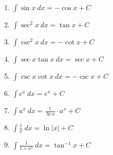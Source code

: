 {\begin{minipage}[t]{.55\specialboxlength}
\begin{enumerate}
\item $\int \sin x\ dx = -\cos x+C$\myrule
\item $\int \sec^2 x\ dx = \tan x+C$\myrule
\item $\int \csc^2 x\ dx = -\cot x+C$\myrule
\item $\int \sec x\tan x\ dx = \sec x+C$\myrule
\item $\int \csc x\cot  x\ dx = -\csc x+C$\myrule
\item $\int e^x\ dx = e^x+C$\myrule
\item $\int a^x\ dx = \frac{1}{\ln a}\cdot a^x+C$\myrule
\item $\int \frac{1}x\ dx = \ln |x|+C$\myrule
\item $\int \frac{1}{1+x^2}\ dx = \tan^{-1} x+C$\myrule
\end{enumerate}
\end{minipage}%
%
}
%

